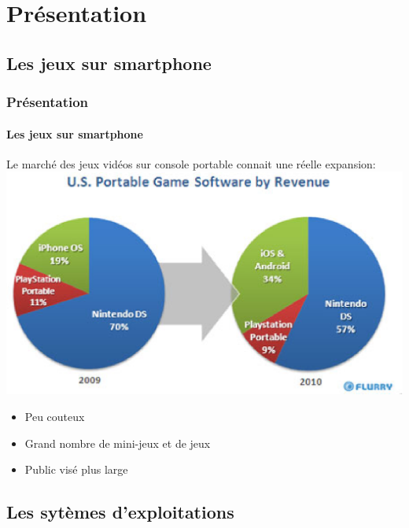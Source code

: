\section{Présentation}

\subsection{Les jeux sur smartphone}

\begin{frame}
\frametitle{Présentation}
\framesubtitle{Les jeux sur smartphone}
Le marché des jeux vidéos sur console portable connait une réelle expansion: \\ \includegraphics[scale=0.4]{img/marche_console_portable.eps} 

\begin{itemize} 
		\item{Peu couteux}
		\item{Grand nombre de mini-jeux et de jeux}
		\item{Public visé plus large}
\end{itemize}
\end{frame}



\subsection{Les sytèmes d'exploitations}


